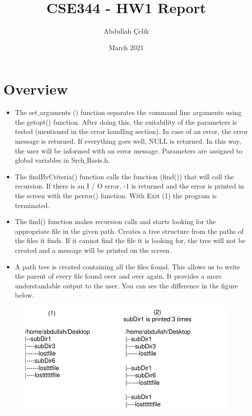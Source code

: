 \documentclass{article}
\title{CSE344 - HW1 Report}
\author{Abdullah Çelik}
\date{March 2021}
\begin{document}
\maketitle

\section{Overview}
\begin{itemize}
    \item The set$\_$arguments () function separates the command line arguments using the getopt() function. After doing this, the suitability of the parameters is tested (mentioned in the error handling section). In case of an error, the error message is returned. If everything goes well, NULL is returned. In this way, the user will be informed with an error message. Parameters are assigned to global variables in Srch$\_$Basis.h.
    \item The findByCriteria() function calls the function (find()) that will call the recursion. If there is an I / O error, -1 is returned and the error is printed in the screen with the perror() function. With Exit (1) the program is terminated.
    \item The find() function makes recursion calls and starts looking for the appropriate file in the given path. Creates a tree structure from the paths of the files it finds. If it cannot find the file it is looking for, the tree will not be created and a message will be printed on the screen.
    \item A path tree is created containing all the files found. This allows us to write the parent of every file found over and over again. It provides a more understandable output to the user. You can see the difference in the figure below.
\end{itemize}

\begin{figure}[h]
	\centering
	\includegraphics[scale=0.3]{fig1.png}
\end{figure}
\newpage
\end{document}
